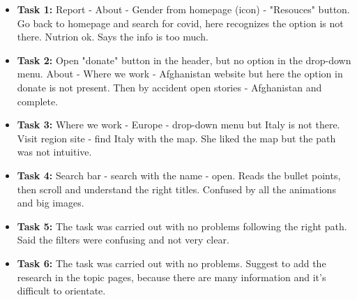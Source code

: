 \begin{itemize}
	\item \textbf{Task 1:} Report - About - Gender from homepage (icon) - "Resouces" button. Go back to homepage and search for covid, here recognizes the option is not there. Nutrion ok. Says the info is too much.
	\item \textbf{Task 2:} Open "donate" button in the header, but no option in the drop-down menu. About - Where we work - Afghanistan website but here the option in donate is not present. Then by accident open stories - Afghanistan and complete.
	\item \textbf{Task 3:} Where we work - Europe - drop-down menu but Italy is not there. Visit region site - find Italy with the map. She liked the map but the path was not intuitive.
	\item \textbf{Task 4:} Search bar - search with the name - open. Reads the bullet points, then scroll and understand the right titles. Confused by all the animations and big images.
	\item \textbf{Task 5:} The task was carried out with no problems following the right path. Said the filters were confusing and not very clear.
	\item \textbf{Task 6:} The task was carried out with no problems. Suggest to add the research in the topic pages, because there are many information and it's difficult to orientate.
\end{itemize}






\vspace{1cm}

